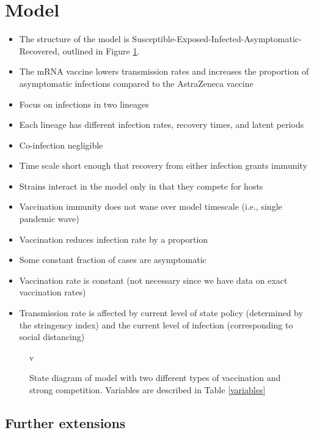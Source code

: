 \documentclass{article}
\begin{document}
\section{Model}
\label{model}
\begin{itemize}
    \item The structure of the model is Susceptible-Exposed-Infected-Asymptomatic-Recovered, outlined in Figure \ref{model_structure}.
    \item The mRNA vaccine lowers transmission rates and increases the proportion of asymptomatic infections compared to the AstraZeneca vaccine
    \item Focus on infections in two lineages
    \item Each lineage has different infection rates, recovery times, and latent periods
    \item Co-infection negligible 
    \item Time scale short enough that recovery from either infection grants immunity
    \item Strains interact in the model only in that they compete for hosts
    \item Vaccination immunity does not wane over model timescale (i.e., single pandemic wave)
    \item Vaccination reduces infection rate by a proportion
    \item Some constant fraction of cases are asymptomatic
    \item Vaccination rate is constant (not necessary since we have data on exact vaccination rates)
    \item Transmission rate is affected by current level of state policy (determined by the stringency index) and the current level of infection (corresponding to social distancing)
\end{itemize}

\begin{figure}[h!]
    \centering
    v   
\caption{State diagram of model with two different types of vaccination and strong competition. Variables are described in Table \ref{variables}}
\label{model_structure}
\end{figure}

\subsection*{Further extensions}
\end{document}

